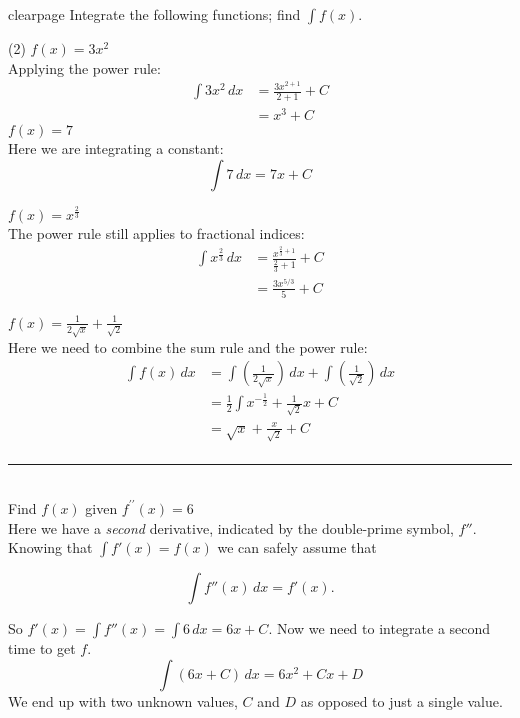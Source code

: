 clearpage
\example Integrate the following functions; find $\displaystyle\int f(x)$.
\begin{tasks}(2)
	\task $f(x) =3x^{2}$ \medskip\\
	\solution Applying the power rule:\\
\begin{align*}\int 3x^{2}\,dx&=\frac{3x^{2+1}}{2+1}+C\\
	&=x^3+C\end{align*}
\task $f (x) =7$ \medskip \\
\solution Here we are integrating a constant:\\
\[\int 7\,dx=7x+C\]

\task $f(x) =x^{\frac{2}{3}}$ \medskip\\
\solution The power rule still applies to fractional indices:\\
\begin{align*}\int x^{\frac{2}{3}}\,dx&=\frac{x^{\frac{2}{3}+1}}{\frac{2}{3}+1}+C\\
&=\frac{3 x^{5/3}}{5}+C \end{align*}

\task $f (x) =\frac{1}{2 \sqrt{x}} +\frac{1}{\sqrt{2}}$ \medskip\\
\solution Here we need to combine the sum rule and the power rule:\\
\begin{align*}
\int f(x)\,dx &= \int(\frac{1}{2 \sqrt{x}}) \,dx+\int(\frac{1}{\sqrt{2}}) \,dx\\
&=\frac{1}{2}\int x^{-\frac{1}{2}}+\frac{1}{\sqrt{2}}x+C\\
&=\sqrt{x}+\frac{x}{\sqrt{2}}+C\\
\end{align*}\end{tasks}

\rule{6.8cm}{0.5pt}\\
\example Find $f (x)$ given $f^{ \prime  \prime } (x) =6$\medskip\\
\solution Here we have a \textit{second} derivative, indicated by the double-prime symbol, $f''$. Knowing that $\int f'(x)=f(x)$ we can safely assume that 
\begin{tcolorbox}
	\[\int f''(x) \,dx = f'(x).\]
\end{tcolorbox}
So $f'(x)=\int f''(x) = \int 6 \,dx = 6x+C$. Now we need to integrate a second time to get $f$.
\[\int (6x+C)\,dx=6x^2+Cx+D\]
We end up with two unknown values, $C$ and $D$ as opposed to just a single value.

